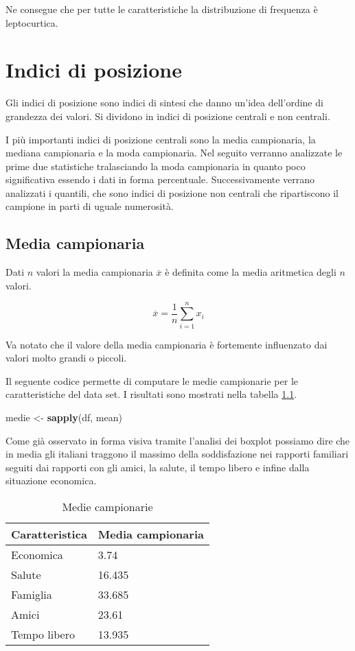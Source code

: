 \documentclass[]{book}
\newenvironment{Shaded}{\begin{snugshade}}{\end{snugshade}}
\newcommand{\KeywordTok}[1]{\textcolor[rgb]{0.13,0.29,0.53}{\textbf{#1}}}
\newcommand{\StringTok}[1]{\textcolor[rgb]{0.31,0.60,0.02}{#1}}
\newcommand{\NormalTok}[1]{#1}
\begin{document}
Ne consegue che per tutte le caratteristiche la distribuzione di
frequenza è leptocurtica.

\chapter{Indici di posizione}\label{indici-di-posizione}

Gli indici di posizione sono indici di sintesi che danno un'idea
dell'ordine di grandezza dei valori. Si dividono in indici di posizione
centrali e non centrali.

I più importanti indici di posizione centrali sono la media campionaria,
la mediana campionaria e la moda campionaria. Nel seguito verranno
analizzate le prime due statistiche tralasciando la moda campionaria in
quanto poco significativa essendo i dati in forma percentuale.
Successivamente verrano analizzati i quantili, che sono indici di
posizione non centrali che ripartiscono il campione in parti di uguale
numerosità.

\section{Media campionaria}\label{media-campionaria}

Dati \(n\) valori la media campionaria \(\overline{x}\) è definita come
la media aritmetica degli \(n\) valori.

\[\overline{x} = \frac{1}{n} \sum_{i=1}^{n}x_i\]

Va notato che il valore della media campionaria è fortemente influenzato
dai valori molto grandi o piccoli.

Il seguente codice permette di computare le medie campionarie per le
caratteristiche del data set. I risultati sono mostrati nella tabella
\ref{tab:media-campionaria}.

\begin{Shaded}
\begin{Highlighting}[]
\NormalTok{medie <-}\StringTok{ }\KeywordTok{sapply}\NormalTok{(df, mean)}
\end{Highlighting}
\end{Shaded}

Come già osservato in forma visiva tramite l'analisi dei boxplot
possiamo dire che in media gli italiani traggono il massimo della
soddisfazione nei rapporti familiari seguiti dai rapporti con gli amici,
la salute, il tempo libero e infine dalla situazione economica.

\begin{table}

\caption{\label{tab:media-campionaria}Medie campionarie}
\centering
\begin{tabular}[t]{l|l}
\hline
Caratteristica & Media campionaria\\
\hline
Economica & 3.74\\
\hline
Salute & 16.435\\
\hline
Famiglia & 33.685\\
\hline
Amici & 23.61\\
\hline
Tempo libero & 13.935\\
\hline
\end{tabular}
\end{table}
\end{document}
